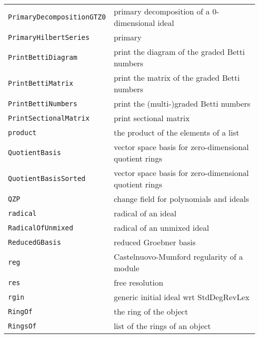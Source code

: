 \documentclass[a4paper]{mybook}
\begin{document}
\begin{center}
\begin{longtable}{ll}
{\verb~PrimaryDecompositionGTZ0~} &
      primary decomposition of a 0-dimensional ideal\\
   
{\verb~PrimaryHilbertSeries~} &
      primary\\
   
{\verb~PrintBettiDiagram~} &
      print the diagram of the graded Betti numbers\\
   
{\verb~PrintBettiMatrix~} &
      print the matrix of the graded Betti numbers\\
   
{\verb~PrintBettiNumbers~} &
      print the (multi-)graded Betti numbers\\
   
{\verb~PrintSectionalMatrix~} &
      print sectional matrix\\
   
{\verb~product~} &
      the product of the elements of a list\\
   
{\verb~QuotientBasis~} &
      vector space basis for zero-dimensional quotient rings\\
   
{\verb~QuotientBasisSorted~} &
      vector space basis for zero-dimensional quotient rings\\
   
{\verb~QZP~} &
      change field for polynomials and ideals\\
   
{\verb~radical~} &
      radical of an ideal\\
   
{\verb~RadicalOfUnmixed~} &
      radical of an unmixed ideal\\
   
{\verb~ReducedGBasis~} &
      reduced Groebner basis\\
   
{\verb~reg~} &
      Castelnuovo-Mumford regularity of a module\\
   
{\verb~res~} &
      free resolution\\
   
{\verb~rgin~} &
      generic initial ideal wrt StdDegRevLex\\
   
{\verb~RingOf~} &
      the ring of the object\\
   
{\verb~RingsOf~} &
      list of the rings of an object\\
   

\end{longtable}
\end{center}
\end{document}
